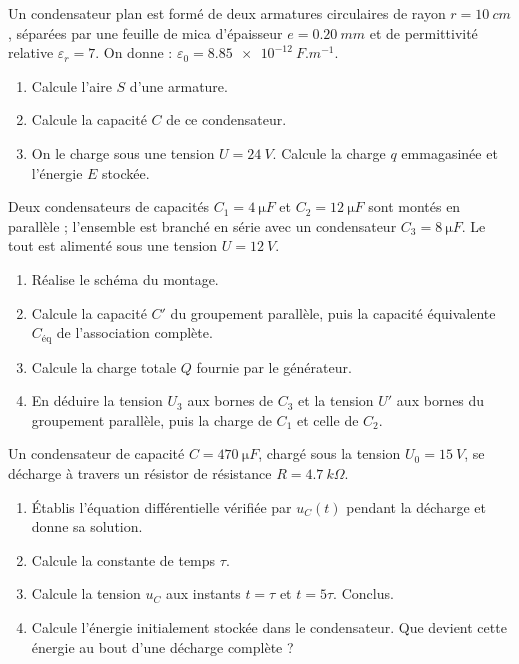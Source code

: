 \documentclass[11pt]{article}
\newcounter{popsec}
\newcounter{popsub}
\newcommand{\courssub}[1]{%
  \stepcounter{popsub}%
  \par\vspace{9pt}\noindent{\popxbold\fontsize{11.5}{13}\selectfont\color{popink}{\color{poporange}\thepopsec.\thepopsub}\hspace{6pt}#1}\par\nopagebreak\vspace{4pt}
}
\begin{document}
\courssub{Je m'entraîne}

\begin{exercice}
Un condensateur plan est formé de deux armatures circulaires de rayon $r = \SI{10}{cm}$, séparées par une feuille de mica d'épaisseur $e = \SI{0,20}{mm}$ et de permittivité relative $\varepsilon_r = 7$.
On donne : $\varepsilon_0 = \SI{8,85e-12}{F.m^{-1}}$.
\begin{enumerate}
\item Calcule l'aire $S$ d'une armature.
\item Calcule la capacité $C$ de ce condensateur.
\item On le charge sous une tension $U = \SI{24}{V}$. Calcule la charge $q$ emmagasinée et l'énergie $E$ stockée.
\end{enumerate}
\end{exercice}

\begin{exercice}
Deux condensateurs de capacités $C_1 = \SI{4}{\micro F}$ et $C_2 = \SI{12}{\micro F}$ sont montés en parallèle ; l'ensemble est branché en série avec un condensateur $C_3 = \SI{8}{\micro F}$. Le tout est alimenté sous une tension $U = \SI{12}{V}$.
\begin{enumerate}
\item Réalise le schéma du montage.
\item Calcule la capacité $C'$ du groupement parallèle, puis la capacité équivalente $C_{\text{éq}}$ de l'association complète.
\item Calcule la charge totale $Q$ fournie par le générateur.
\item En déduire la tension $U_3$ aux bornes de $C_3$ et la tension $U'$ aux bornes du groupement parallèle, puis la charge de $C_1$ et celle de $C_2$.
\end{enumerate}
\end{exercice}

\begin{exercice}
Un condensateur de capacité $C = \SI{470}{\micro F}$, chargé sous la tension $U_0 = \SI{15}{V}$, se décharge à travers un résistor de résistance $R = \SI{4,7}{k\Omega}$.
\begin{enumerate}
\item Établis l'équation différentielle vérifiée par $u_C(t)$ pendant la décharge et donne sa solution.
\item Calcule la constante de temps $\tau$.
\item Calcule la tension $u_C$ aux instants $t = \tau$ et $t = 5\tau$. Conclus.
\item Calcule l'énergie initialement stockée dans le condensateur. Que devient cette énergie au bout d'une décharge complète ?
\end{enumerate}
\end{exercice}
\end{document}
